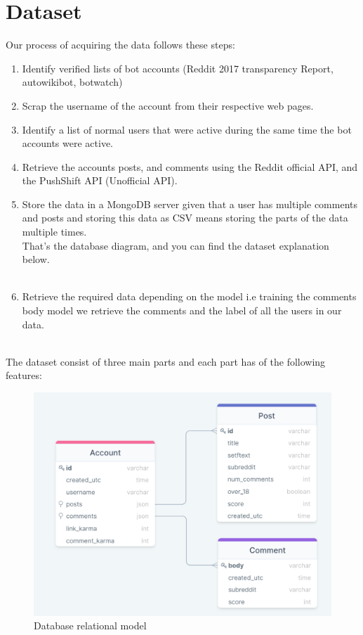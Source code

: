 \documentclass{article}
\begin{document}
    \section{Dataset}
    Our process of acquiring the data follows these steps:
        \begin{enumerate}
            \item Identify verified lists of bot accounts (Reddit 2017 transparency Report, autowikibot, botwatch)
            \item Scrap the username of the account from their respective web pages.
            \item Identify a list of normal users that were active during the same time the bot accounts were active.
            \item Retrieve the accounts posts, and comments using the Reddit official API, and the PushShift API (Unofficial API).
            \item Store the data in a MongoDB server given that a user has multiple comments and posts and storing this data as CSV means storing the parts of the data multiple times.\\
            That's the database diagram, and you can find the dataset explanation below.\\ \\
            \item Retrieve the required data depending on the model i.e training the comments body model we retrieve the comments and the label of all the users in our data. \\ \\
        \end{enumerate}
    The dataset consist of three main parts and each part has of the following features:
        \begin{figure}[H]
            \centering
            \includegraphics[width=\textwidth,height=\textheight,keepaspectratio]{db}
            \caption{Database relational model}
        \end{figure}
\end{document}
